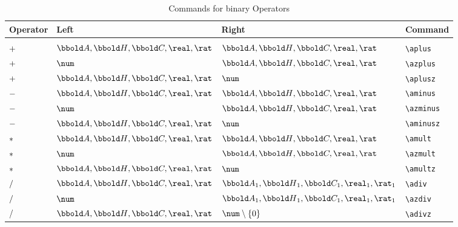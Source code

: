 \documentclass[12pt]{article}
\begin{document}
\begin{table}[htbp]
  \centering
  \begin{tabular}{llll}
    Operator & Left & Right & Command \\
    \hline \\
    $+$ & $\arithmos, \quaternions, \complex, \real, \rat$ &
                                                                  $\arithmos,
                                                                  \quaternions, 
                                                                  \complex, \real, \rat$ & \verb|\aplus| \\
    $+$ & $\num$ & $\arithmos, \quaternions, \complex, \real, \rat$ & \verb|\azplus| \\
    $+$ & $\arithmos, \quaternions, \complex, \real, \rat$ & $\num$ & \verb|\aplusz| \\
    $-$ & $\arithmos, \quaternions, \complex, \real, \rat$ & $\arithmos, \quaternions, \complex, \real, \rat$ & \verb|\aminus| \\
    $-$ & $\num$ & $\arithmos, \quaternions, \complex, \real, \rat$ & \verb|\azminus| \\
    $-$ & $\arithmos, \quaternions, \complex, \real, \rat$ & $\num$ & \verb|\aminusz| \\
    $*$ & $\arithmos, \quaternions, \complex, \real, \rat$ & $\arithmos, \quaternions, \complex, \real, \rat$ & \verb|\amult| \\
    $*$ & $\num$ & $\arithmos, \quaternions, \complex, \real, \rat$ & \verb|\azmult| \\
    $*$ & $\arithmos, \quaternions, \complex, \real, \rat$ & $\num$ & \verb|\amultz| \\
    $/$ & $\arithmos, \quaternions, \complex, \real, \rat$ & $\arithmos_1, \quaternions_1, \complex_1, \real_1, \rat_1$ & \verb|\adiv| \\
    $/$ & $\num$ & $\arithmos_1, \quaternions_1, \complex_1, \real_1, \rat_1$ & \verb|\azdiv| \\
    $/$ & $\arithmos, \quaternions, \complex, \real, \rat$ & $\num \setminus \{0\}$ & \verb|\adivz| \\
    \hline
  \end{tabular}
  \caption{Commands for binary Operators}
  \label{tab:latex-binary-operators}
\end{table}
%
\end{document}
